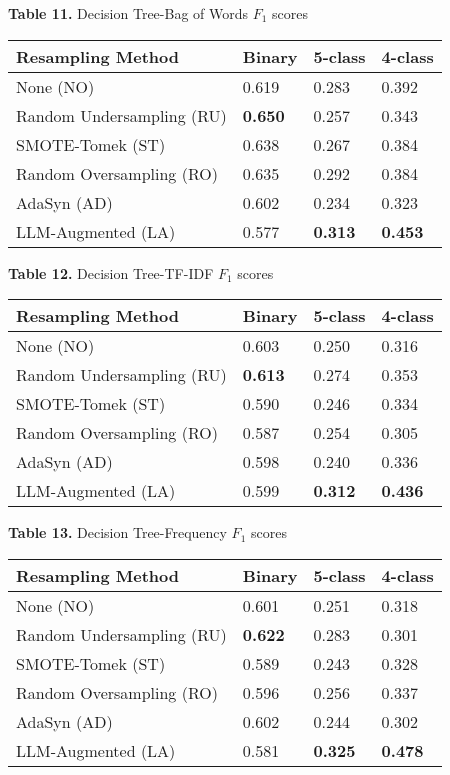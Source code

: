 \documentclass[runningheads]{llncs}
\newenvironment{nscenter}
 {\parskip=0pt\par\nopagebreak\centering}
 {\par\noindent\ignorespacesafterend}
\begin{document}
\begin{nscenter}
{\bf Table 11.} Decision Tree-Bag of Words $F_1$ scores\\

\begin{tabular}{|l|l|l|l|}
\hline
Resampling Method & Binary & 5-class & 4-class \\\hline
None (NO) & 0.619 & 0.283 & 0.392 \\\hline
Random Undersampling (RU) & {\bf 0.650} & 0.257 & 0.343 \\\hline
SMOTE-Tomek (ST) & 0.638 & 0.267 & 0.384 \\\hline
Random Oversampling (RO) & 0.635 & 0.292 & 0.384 \\\hline
AdaSyn (AD) & 0.602 & 0.234 & 0.323 \\\hline
LLM-Augmented (LA) & 0.577 & {\bf 0.313} & {\bf 0.453} \\\hline
\end{tabular}
\end{nscenter}

\begin{nscenter}
{\bf Table 12.} Decision Tree-TF-IDF $F_1$ scores\\

\begin{tabular}{|l|l|l|l|}
\hline
Resampling Method & Binary & 5-class & 4-class \\\hline
None (NO) & 0.603 & 0.250 & 0.316 \\\hline
Random Undersampling (RU) & {\bf 0.613} & 0.274 & 0.353 \\\hline
SMOTE-Tomek (ST) & 0.590 & 0.246 & 0.334 \\\hline
Random Oversampling (RO) & 0.587 & 0.254 & 0.305 \\\hline
AdaSyn (AD) & 0.598 & 0.240 & 0.336 \\\hline
LLM-Augmented (LA) & 0.599 & {\bf 0.312} & {\bf 0.436} \\\hline
\end{tabular}
\end{nscenter}

\clearpage
\begin{nscenter}
{\bf Table 13.} Decision Tree-Frequency $F_1$ scores\\

\begin{tabular}{|l|l|l|l|}
\hline
Resampling Method & Binary & 5-class & 4-class \\\hline
None (NO) & 0.601 & 0.251 & 0.318 \\\hline
Random Undersampling (RU) & {\bf 0.622} & 0.283 & 0.301 \\\hline
SMOTE-Tomek (ST) & 0.589 & 0.243 & 0.328 \\\hline
Random Oversampling (RO) & 0.596 & 0.256 & 0.337 \\\hline
AdaSyn (AD) & 0.602 & 0.244 & 0.302 \\\hline
LLM-Augmented (LA) & 0.581 & {\bf 0.325} & {\bf 0.478} \\\hline
\end{tabular}
\end{nscenter}
\end{document}
